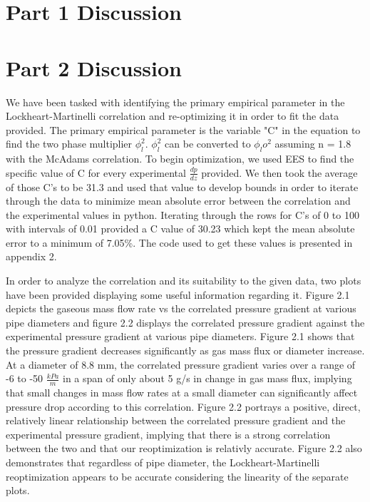 \documentclass[10pt]{article}
\begin{document}
\section{Part 1 Discussion}

\section{Part 2 Discussion}
\par
We have been tasked with identifying the primary empirical parameter in the Lockheart-Martinelli correlation and re-optimizing it in order to fit the data provided. The primary empirical parameter is the variable "C" in the equation to find the two phase multiplier $\phi_l^2$. $\phi_l^2$ can be converted to $\phi_lo^2$ assuming n = 1.8 with the McAdams correlation. To begin optimization, we used EES to find the specific value of C for every 
experimental $\frac{dp}{dz}$ provided. We then took the average of those C's to be 31.3 and used that value to develop bounds in order to iterate through the data  to minimize mean absolute error between the correlation and the experimental values in python. Iterating through the rows for C's of 0 to 100 with intervals of  0.01 provided a C value of 30.23 which kept the mean absolute error to a minimum of 7.05\%. The code used to get these values is presented in appendix 2.
\par
In order to analyze the correlation and its suitability to the given data, two plots have been provided displaying some useful information regarding it. 
Figure 2.1 depicts the gaseous mass flow rate vs the correlated pressure gradient at various pipe diameters and figure 2.2 displays the correlated pressure gradient
against the experimental pressure gradient at various pipe diameters. Figure 2.1 shows that the pressure gradient decreases significantly as gas mass flux or 
diameter increase. At a diameter of 8.8 mm, the correlated pressure gradient varies over a range of -6 to -50 $\frac{kPa}{m}$ in a span of only about 5 g/s in change in gas mass flux, 
implying that small changes in mass flow rates at a small diameter can significantly affect pressure drop according to this correlation. Figure 2.2 
portrays a positive, direct, relatively linear relationship between the correlated pressure gradient and the experimental pressure gradient, implying 
that there is a strong correlation between the two and that our reoptimization is relativly accurate. Figure 2.2 also demonstrates that regardless 
of pipe diameter, the Lockheart-Martinelli reoptimization appears to be accurate considering the linearity of the separate plots. 
\end{document}
